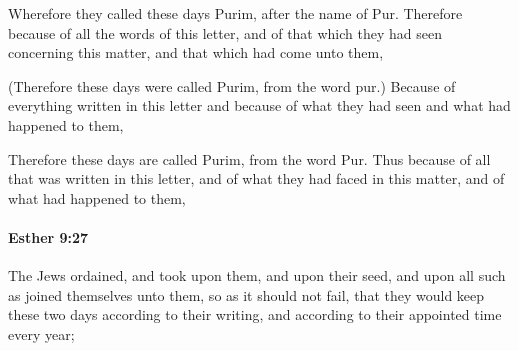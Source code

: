 			\begin{versebox}
					\item[BHS] 
					\item[LXX] 
					\item[ASV] Wherefore they called these days Purim, after the name of Pur. Therefore because of all the words of this letter, and of that which they had seen concerning this matter, and that which had come unto them,
					\item[NIV] (Therefore these days were called Purim, from the word pur.) Because of everything written in this letter and because of what they had seen and what had happened to them,
					\item[NRSV] Therefore these days are called Purim, from the word Pur. Thus because of all that was written in this letter, and of what they had faced in this matter, and of what had happened to them,
			\end{versebox}

		\paragraph{Esther 9:27} %
			\label{ESTHER-9-27}

			The Jews ordained, and took upon them, and upon their seed, and upon all such as joined themselves unto them, so as it should not fail, that they would keep these two days according to their writing, and according to their appointed time every year;


